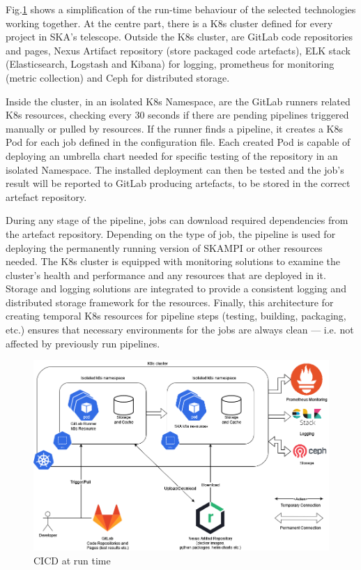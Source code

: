 \documentclass[a4paper,
	       keeplastbox,   %
	       References
	       ]{jacow}
\begin{document}
Fig.\ref{fig:cicdruntime} shows a simplification of the run-time behaviour of the selected technologies working together. At the centre part, there is a K8s cluster defined for every project in SKA's telescope. Outside the K8s cluster, are GitLab code repositories and pages, Nexus Artifact repository\cite{nexus} (store packaged code artefacts), ELK stack (Elasticsearch, Logstash and Kibana)\cite{elastcsearch} for logging, prometheus\cite{prometheus} for monitoring (metric collection) and Ceph\cite{ceph} for distributed storage.

Inside the cluster, in an isolated K8s Namespace, are the GitLab runners related K8s resources, checking every 30 seconds if there are pending pipelines triggered manually or pulled by resources. If the runner finds a pipeline, it creates a K8s Pod for each job defined in the configuration file. Each created Pod is capable of deploying an umbrella chart needed for specific testing of the repository in an isolated Namespace. The installed deployment can then be tested and the job's result will be reported to GitLab producing artefacts, to be stored in the correct artefact repository.

During any stage of the pipeline, jobs can download required dependencies from the artefact repository. Depending on the type of job, the pipeline is used for deploying the permanently running version of SKAMPI or other resources needed. The K8s cluster is equipped with monitoring solutions to examine the cluster's health and performance and any resources that are deployed in it. Storage and logging solutions are integrated to provide a consistent logging and distributed storage framework for the resources. Finally, this architecture for creating temporal K8s resources for pipeline steps (testing, building, packaging, etc.) ensures that necessary environments for the jobs are always clean — i.e. not affected by previously run pipelines.

\begin{figure}[!htb]
   \centering
   \includegraphics*[width=0.8\columnwidth]{cicdruntime-v2}
   \caption{CICD at run time}
   \label{fig:cicdruntime}
\end{figure}
\end{document}
